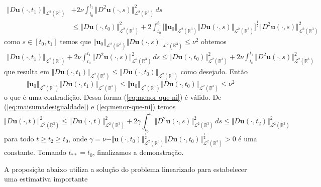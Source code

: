 \documentclass[a4paper, 11pt]{book}
\theoremstyle{definition}
\newcommand{\bR}{\mathbb{R}}
\newcommand{\bu}{\mathbf{u}}
\newcommand{\cL}{\mathcal{L}}
\begin{document}
\begin{prf}
\[\begin{aligned}
            \Vert D\bu(\cdot,t_1) \Vert_{\cL^2(\bR^3)} &+ 2 \nu \int_{t_0}^{t_1} \Vert D^2 \bu(\cdot,s) \Vert_{\cL^2(\bR^3)}^2 \,ds\\ &\leqslant \Vert D\bu(\cdot,t_0) \Vert_{\cL^2(\bR^3)}^2 + 2 \! \int_{t_0}^{t_1} \big[ \Vert \bu_0 \Vert_{\cL^2(\bR^3)} \Vert D\bu(\cdot,s) \Vert_{\cL^2(\bR^3)} \big]^\frac{1}{2} \Vert D^2\bu(\cdot,s) \Vert_{\cL^2(\bR^3)}^2
        \end{aligned}
    \]
    como $s \in [t_0,t_1]$ temos que $\Vert \bu_0 \Vert_{\cL^2(\bR^3)} \Vert D\bu(\cdot,s) \Vert_{\cL^2(\bR^3)} \leqslant \nu^2$ obtemos
    \[
        \begin{aligned}
            \Vert D\bu(\cdot,t_1) \Vert_{\cL^2(\bR^3)} + 2 \nu \int_{t_0}^{t_1} \Vert D^2 \bu(\cdot,s) \Vert_{\cL^2(\bR^3)}^2 \,ds \leqslant \Vert D\bu(\cdot,t_0) \Vert_{\cL^2(\bR^3)}^2 + 2\nu  \! \int_{t_0}^{t_1} \Vert D^2\bu(\cdot,s) \Vert_{\cL^2(\bR^3)}^2
        \end{aligned}
    \]
    que resulta em $\Vert D\bu(\cdot,t_1) \Vert_{\cL^2(\bR^3)} \leqslant \Vert D\bu(\cdot,t_0) \Vert_{\cL^2(\bR^3)}$ como desejado.
    Então 
    \[
        \Vert \bu_0 \Vert_{\cL^2(\bR^3)} \Vert D\bu(\cdot,t_1) \Vert_{\cL^2(\bR^3)} \leqslant \Vert \bu_0 \Vert_{\cL^2(\bR^3)}\Vert D\bu(\cdot,t_0) \Vert_{\cL^2(\bR^3)} \leqslant \nu^2
    \]
    o que é uma contradição. Dessa forma (\ref{eq:menor-que-ni}) é válido.
    De (\ref{eq:maisumadesigualdade}) e (\ref{eq:menor-que-ni}) temos
    \[
        \Vert D\bu(\cdot,t) \Vert_{\cL^2(\bR^3)}^2 \leqslant \Vert D\bu(\cdot,t) \Vert_{\cL^2(\bR^3)}^2 + 2 \gamma \! \int_{t_0}^{t} \Vert D^2 \bu(\cdot,s) \Vert_{\cL^2(\bR^3)}^2 \,ds \leqslant \Vert D\bu(\cdot,t_2) \Vert_{\cL^2(\bR^3)}^2
    \]
    para todo $t \geqslant t_2 \geqslant t_0$, onde $\gamma = \nu - \Vert \bu(\cdot,t_0) \Vert_{\cL^2(\bR^3)}^{\frac{1}{2}} \Vert D\bu(\cdot,t_0) \Vert_{\cL^2(\bR^3)}^{\frac{1}{2}} > 0$ é uma constante.
    Tomando $t_{**} = t_0$, finalizamos a demonstração.
\end{prf}

A proposição abaixo utiliza a solução do problema linearizado para estabelecer uma estimativa importante
\end{document}
